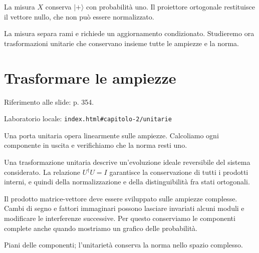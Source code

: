 
La misura \(X\) conserva \(|+\rangle \) con probabilità uno. Il proiettore ortogonale restituisce il vettore nullo, che non può essere normalizzato.\par


La misura separa rami e richiede un aggiornamento condizionato. Studieremo ora trasformazioni unitarie che conservano insieme tutte le ampiezze e la norma.\par


\Needspace{.43\textheight}
\section{Trasformare le ampiezze}
\label{c2-unitarie}

{\sffamily\small\color{Ink!70} Riferimento alle slide: p. 354.\par}

{\sffamily\small\color{Ink!70} Laboratorio locale: \nolinkurl{index.html#capitolo-2/unitarie}\par}

Una porta unitaria opera linearmente sulle ampiezze. Calcoliamo ogni componente in uscita e verifichiamo che la norma resti uno.\par

Una trasformazione unitaria descrive un'evoluzione ideale reversibile del sistema considerato. La relazione \(U{}^{\dagger} U=I\) garantisce la conservazione di tutti i prodotti interni, e quindi della normalizzazione e della distinguibilità fra stati ortogonali.\par

Il prodotto matrice-vettore deve essere sviluppato sulle ampiezze complesse. Cambi di segno e fattori immaginari possono lasciare invariati alcuni moduli e modificare le interferenze successive. Per questo conserviamo le componenti complete anche quando mostriamo un grafico delle probabilità.\par



Piani delle componenti; l'unitarietà conserva la norma nello spazio complesso.\par


